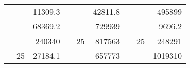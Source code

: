 \begin{table}[H]
\begin{tabular}{|ccrccrccc}
\rowcolor[HTML]{DAE8FC} 
\multicolumn{1}{|c|}{\cellcolor[HTML]{FFFFC7}}                                & \multicolumn{1}{c|}{\cellcolor[HTML]{DAE8FC}}                      & \multicolumn{1}{r|}{\cellcolor[HTML]{DAE8FC}11309.3}   & \multicolumn{1}{c|}{\cellcolor[HTML]{FFFFC7}}                                & \multicolumn{1}{c|}{\cellcolor[HTML]{DAE8FC}}                       & \multicolumn{1}{r|}{\cellcolor[HTML]{DAE8FC}42811.8}   & \multicolumn{1}{c|}{\cellcolor[HTML]{FFFFC7}}                                & \multicolumn{1}{c|}{\cellcolor[HTML]{DAE8FC}}                      & \multicolumn{1}{r|}{\cellcolor[HTML]{DAE8FC}495899}    \\ \cline{3-3} \cline{6-6} \cline{9-9} 
\multicolumn{1}{|c|}{\cellcolor[HTML]{FFFFC7}}                                & \multicolumn{1}{c|}{\cellcolor[HTML]{DAE8FC}}                      & \multicolumn{1}{r|}{\cellcolor[HTML]{DDFDFF}68369.2}   & \multicolumn{1}{c|}{\cellcolor[HTML]{FFFFC7}}                                & \multicolumn{1}{c|}{\cellcolor[HTML]{DAE8FC}}                       & \multicolumn{1}{r|}{\cellcolor[HTML]{DDFDFF}729939}    & \multicolumn{1}{c|}{\cellcolor[HTML]{FFFFC7}}                                & \multicolumn{1}{c|}{\cellcolor[HTML]{DAE8FC}}                      & \multicolumn{1}{r|}{\cellcolor[HTML]{DDFDFF}9696.2}    \\ \cline{3-3} \cline{6-6} \cline{9-9} 
\rowcolor[HTML]{DAE8FC} 
\multicolumn{1}{|c|}{\cellcolor[HTML]{FFFFC7}}                                & \multicolumn{1}{c|}{\cellcolor[HTML]{DAE8FC}}                      & \multicolumn{1}{r|}{\cellcolor[HTML]{DAE8FC}240340}    & \multicolumn{1}{c|}{\cellcolor[HTML]{FFFFC7}}                                & \multicolumn{1}{c|}{\multirow{-9}{*}{\cellcolor[HTML]{DAE8FC}25}}   & \multicolumn{1}{r|}{\cellcolor[HTML]{DAE8FC}817563}    & \multicolumn{1}{c|}{\cellcolor[HTML]{FFFFC7}}                                & \multicolumn{1}{c|}{\multirow{-9}{*}{\cellcolor[HTML]{DAE8FC}25}}  & \multicolumn{1}{r|}{\cellcolor[HTML]{DAE8FC}248291}    \\ \cline{3-3} \cline{5-6} \cline{8-9} 
\multicolumn{1}{|c|}{\cellcolor[HTML]{FFFFC7}}                                & \multicolumn{1}{c|}{\multirow{-10}{*}{\cellcolor[HTML]{DAE8FC}25}} & \multicolumn{1}{r|}{\cellcolor[HTML]{DDFDFF}27184.1}   & \multicolumn{1}{c|}{\cellcolor[HTML]{FFFFC7}}                                & \multicolumn{1}{c|}{\cellcolor[HTML]{DDFDFF}}                       & \multicolumn{1}{r|}{\cellcolor[HTML]{DAE8FC}657773}    & \multicolumn{1}{c|}{\cellcolor[HTML]{FFFFC7}}                                & \multicolumn{1}{c|}{\cellcolor[HTML]{DDFDFF}}                      & \multicolumn{1}{r|}{\cellcolor[HTML]{DAE8FC}1019310}   \\ \cline{2-3} \cline{6-6} \cline{9-9} 

\end{tabular}
\end{table}

